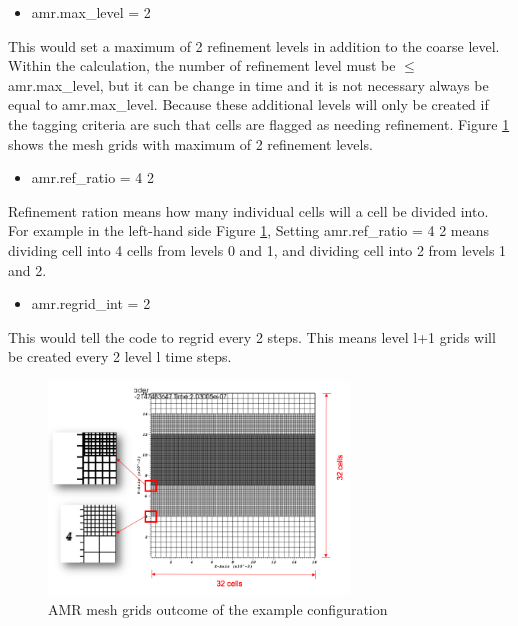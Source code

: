 \begin{itemize}
\item amr.max\_level = 2
\end{itemize}
This would set a maximum of 2 refinement levels in addition to the coarse level. Within the calculation, the number of refinement level must be $\leqslant$ amr.max\_level, but it can be change in time and it is not necessary always be equal to amr.max\_level. Because these additional levels will only be created if the tagging criteria are such that cells are flagged as needing refinement. Figure \ref{fig:AMR_resolution_explaination} shows the mesh grids with maximum of 2 refinement levels.

\begin{itemize}
\item amr.ref\_ratio = 4 2
\end{itemize}
Refinement ration means how many individual cells will a cell be divided into. For example in the left-hand side Figure \ref{fig:AMR_resolution_explaination}, Setting amr.ref\_ratio = 4 2 means dividing cell into 4 cells from levels 0 and 1, and dividing cell into 2 from levels 1 and 2.

\begin{itemize}
\item amr.regrid\_int = 2
\end{itemize}
This would tell the code to regrid every 2 steps. This means level l+1 grids will be created every 2 level l time steps.


\begin{figure}[H]
	\centering
    \includegraphics[width=8cm]{figs/AMR_resolution_explaination.png}
        \caption{AMR mesh grids outcome of the example configuration}
        \label{fig:AMR_resolution_explaination}
\end{figure}
